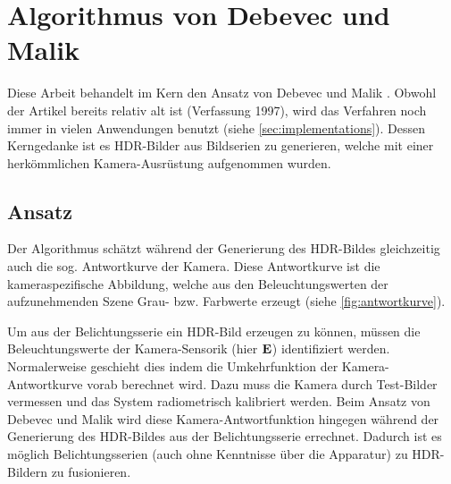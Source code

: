 \chapter{Algorithmus von Debevec und Malik}
\label{chap:algo}
Diese Arbeit behandelt im Kern den Ansatz von Debevec und Malik \cite{paper}. Obwohl der Artikel bereits relativ alt ist (Verfassung 1997), wird das Verfahren noch immer in vielen Anwendungen benutzt (siehe \autoref{sec:implementations}). Dessen Kerngedanke ist es \gls{HDR}-Bilder aus Bildserien zu generieren, welche mit einer herkömmlichen Kamera-Ausrüstung aufgenommen wurden.

\section{Ansatz}
Der Algorithmus schätzt während der Generierung des \gls{HDR}-Bildes gleichzeitig auch die sog. Antwortkurve der Kamera. Diese Antwortkurve ist die kameraspezifische Abbildung, welche aus den Beleuchtungswerten der aufzunehmenden Szene Grau- bzw. Farbwerte erzeugt (siehe \autoref{fig:antwortkurve}). 

Um aus der Belichtungsserie ein \gls{HDR}-Bild erzeugen zu können, müssen die Beleuchtungswerte der Kamera-Sensorik (hier $\mathbf E$) identifiziert werden. Normalerweise geschieht dies indem die Umkehrfunktion der Kamera-Antwortkurve vorab berechnet wird. Dazu muss die Kamera durch Test-Bilder vermessen und das System radiometrisch kalibriert werden. Beim Ansatz von Debevec und Malik wird diese Kamera-Antwortfunktion hingegen während der Generierung des \gls{HDR}-Bildes aus der Belichtungsserie errechnet. Dadurch ist es möglich Belichtungsserien (auch ohne Kenntnisse über die Apparatur) zu \gls{HDR}-Bildern zu fusionieren.


